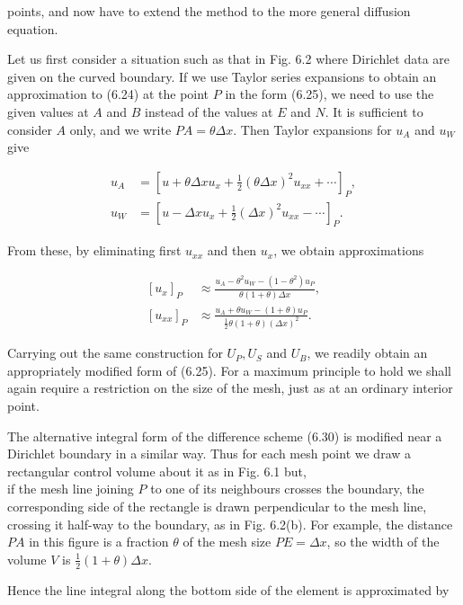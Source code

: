 \documentclass[10pt]{article}
\begin{document}
points, and now have to extend the method to the more general diffusion equation.

Let us first consider a situation such as that in Fig. 6.2 where Dirichlet data are given on the curved boundary. If we use Taylor series expansions to obtain an approximation to (6.24) at the point \(P\) in the form (6.25), we need to use the given values at \(A\) and \(B\) instead of the values at \(E\) and \(N\). It is sufficient to consider \(A\) only, and we write \(P A=\theta \Delta x\). Then Taylor expansions for \(u_{A}\) and \(u_{W}\) give

\[
\begin{aligned}
u_{A} & =\left[u+\theta \Delta x u_{x}+\frac{1}{2}(\theta \Delta x)^{2} u_{x x}+\cdots\right]_{P}, \\
u_{W} & =\left[u-\Delta x u_{x}+\frac{1}{2}(\Delta x)^{2} u_{x x}-\cdots\right]_{P} .
\end{aligned}
\]

From these, by eliminating first \(u_{x x}\) and then \(u_{x}\), we obtain approximations

\[
\begin{aligned}
{\left[u_{x}\right]_{P} } & \approx \frac{u_{A}-\theta^{2} u_{W}-\left(1-\theta^{2}\right) u_{P}}{\theta(1+\theta) \Delta x}, \\
{\left[u_{x x}\right]_{P} } & \approx \frac{u_{A}+\theta u_{W}-(1+\theta) u_{P}}{\frac{1}{2} \theta(1+\theta)(\Delta x)^{2}} .
\end{aligned}
\]

Carrying out the same construction for \(U_{P}, U_{S}\) and \(U_{B}\), we readily obtain an appropriately modified form of (6.25). For a maximum principle to hold we shall again require a restriction on the size of the mesh, just as at an ordinary interior point.

The alternative integral form of the difference scheme (6.30) is modified near a Dirichlet boundary in a similar way. Thus for each mesh point we draw a rectangular control volume about it as in Fig. 6.1 but,\\
if the mesh line joining \(P\) to one of its neighbours crosses the boundary, the corresponding side of the rectangle is drawn perpendicular to the mesh line, crossing it half-way to the boundary, as in Fig. 6.2(b). For example, the distance \(P A\) in this figure is a fraction \(\theta\) of the mesh size \(P E=\Delta x\), so the width of the volume \(V\) is \(\frac{1}{2}(1+\theta) \Delta x\).

Hence the line integral along the bottom side of the element is approximated by
\end{document}
